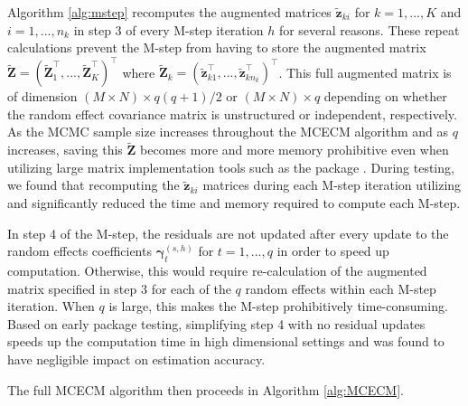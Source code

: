 

Algorithm \ref{alg:mstep} recomputes the augmented matrices
\(\boldsymbol{\tilde z}_{ki}\) for \(k=1,...,K\) and \(i=1,...,n_k\) in
step 3 of every M-step iteration \(h\) for several reasons. These repeat
calculations prevent the M-step from having to store the augmented matrix
\(\boldsymbol{\tilde Z} = (\boldsymbol{\tilde Z}_1^\top,...,\boldsymbol{\tilde Z}_K^\top)^\top\)
where
\(\boldsymbol{\tilde Z}_k = (\boldsymbol{\tilde z}_{k1}^\top,...,\boldsymbol{\tilde z}_{kn_k}^\top)^\top\).
This full augmented matrix is of dimension
\((M\times N) \times q(q + 1)/2\) or \((M\times N) \times q\) depending on
whether the random effect covariance matrix is unstructured or
independent, respectively. As the MCMC sample size increases throughout
the MCECM algorithm and as \(q\) increases, saving this
\(\boldsymbol{\tilde Z}\) becomes more and more memory prohibitive even
when utilizing large matrix implementation tools such as the package
 \citep{bigmemory2013}. During testing, we
found that recomputing the \(\boldsymbol{\tilde z}_{ki}\) matrices
during each M-step iteration utilizing  \citep{rcpp2011} and
 \citep{rcpparmadillo2014} significantly reduced the
time and memory required to compute each M-step.

In step 4 of the M-step, the residuals are not updated after every update to the random effects coefficients
\(\boldsymbol \gamma_t^{(s,h)}\) for \(t=1,...,q\) in order to speed up computation. Otherwise, %
this would require re-calculation of the augmented matrix specified in step 3 for each of the $q$ random effects within each M-step iteration. When \(q\) is large, this makes the M-step prohibitively time-consuming. Based on early package testing, simplifying step 4 with no residual updates speeds up the computation time in high dimensional settings and was found to have negligible impact on estimation accuracy.

The full MCECM algorithm then proceeds in Algorithm \ref{alg:MCECM}.

